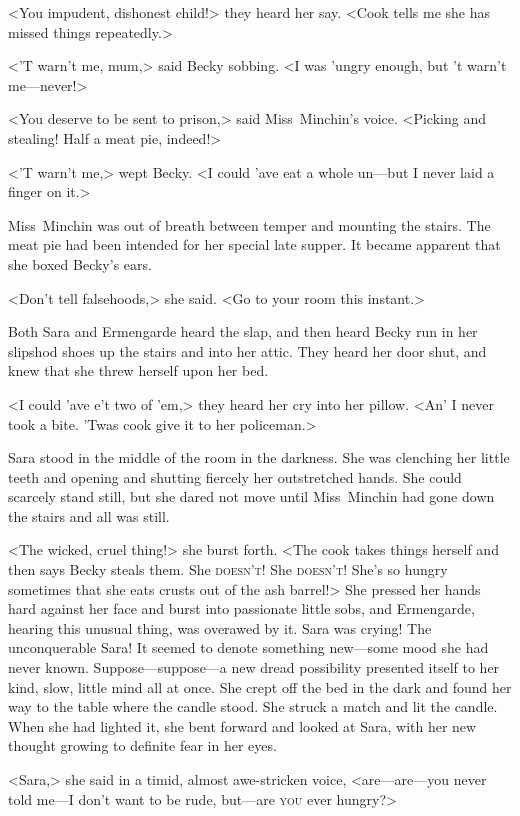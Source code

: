 <You impudent, dishonest child!> they heard her say. <Cook tells me she has missed things repeatedly.>

<'T warn't me, mum,> said Becky sobbing. <I was 'ungry enough, but 't warn't me—never!>

<You deserve to be sent to prison,> said Miss~Minchin's voice. <Picking and stealing! Half a meat pie, indeed!>

<'T warn't me,> wept Becky. <I could 'ave eat a whole un—but I never laid a finger on it.>

Miss~Minchin was out of breath between temper and mounting the stairs. The meat pie had been intended for her special late supper. It became apparent that she boxed Becky's ears.

<Don't tell falsehoods,> she said. <Go to your room this instant.>

Both Sara and Ermengarde heard the slap, and then heard Becky run in her slipshod shoes up the stairs and into her attic. They heard her door shut, and knew that she threw herself upon her bed.

<I could 'ave e't two of 'em,> they heard her cry into her pillow. <An' I never took a bite. 'Twas cook give it to her policeman.>

Sara stood in the middle of the room in the darkness. She was clenching her little teeth and opening and shutting fiercely her outstretched hands. She could scarcely stand still, but she dared not move until Miss~Minchin had gone down the stairs and all was still.

<The wicked, cruel thing!> she burst forth. <The cook takes things herself and then says Becky steals them. She \textsc{doesn't}! She \textsc{doesn't}! She's so hungry sometimes that she eats crusts out of the ash barrel!> She pressed her hands hard against her face and burst into passionate little sobs, and Ermengarde, hearing this unusual thing, was overawed by it. Sara was crying! The unconquerable Sara! It seemed to denote something new—some mood she had never known. Suppose—suppose—a new dread possibility presented itself to her kind, slow, little mind all at once. She crept off the bed in the dark and found her way to the table where the candle stood. She struck a match and lit the candle. When she had lighted it, she bent forward and looked at Sara, with her new thought growing to definite fear in her eyes.

<Sara,> she said in a timid, almost awe-stricken voice, <are—are—you never told me—I don't want to be rude, but—are \textsc{you} ever hungry?>

